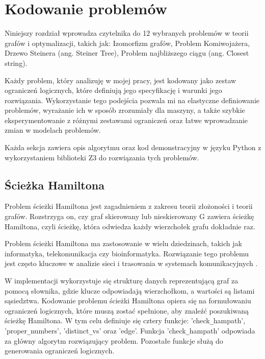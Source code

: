 \chapter{Kodowanie problemów}

Niniejszy rozdział wprowadza czytelnika do 12 wybranych problemów w teorii grafów i optymalizacji, takich jak:
Izomorfizm grafów, 
Problem Komiwojażera, 
Drzewo Steinera (ang. Steiner Tree), 
Problem najbliższego ciągu (ang. Closest string).

Każdy problem, który analizuję w mojej pracy, jest kodowany jako zestaw ograniczeń logicznych, które definiują jego specyfikację i warunki jego rozwiązania. Wykorzystanie tego podejścia pozwala mi na elastyczne definiowanie problemów, wyrażanie ich w sposób zrozumiały dla maszyny, a także szybkie eksperymentowanie z różnymi zestawami ograniczeń oraz łatwe wprowadzanie zmian w modelach problemów.

Każda sekcja zawiera opis algorytmu oraz kod demonstracyjny w języku Python z wykorzystaniem biblioteki Z3 do rozwiązania tych problemów.

\section{Ścieżka Hamiltona}

Problem ścieżki Hamiltona jest zagadnieniem z zakresu teorii złożoności i teorii grafów. Rozstrzyga on, czy graf skierowany lub nieskierowany G zawiera ścieżkę Hamiltona, czyli ścieżkę, która odwiedza każdy wierzchołek grafu dokładnie raz.

Problem ścieżki Hamiltona ma zastosowanie w wielu dziedzinach, takich jak informatyka, telekomunikacja czy bioinformatyka. Rozwiązanie tego problemu jest często kluczowe w analizie sieci i trasowania w systemach komunikacyjnych \cite{enwiki:1190136070}.

W implementacji wykorzystuje się strukturę danych reprezentującą graf za pomocą słownika, gdzie klucze odpowiadają wierzchołkom, a wartości są listami sąsiedztwa. Kodowanie problemu ścieżki Hamiltona opiera się na formułowaniu ograniczeń logicznych, które muszą zostać spełnione, aby znaleźć poszukiwaną ścieżkę Hamiltona. W tym celu definiuje się cztery funkcje: 'check\verb|_|hampath', 'proper\verb|_|numbers', 'distinct\verb|_|vs' oraz 'edge'. Funkcja 'check\verb|_|hampath' odpowiada za główny algorytm rozwiązujący problem. Pozostałe funkcje służą do generowania ograniczeń logicznych.


